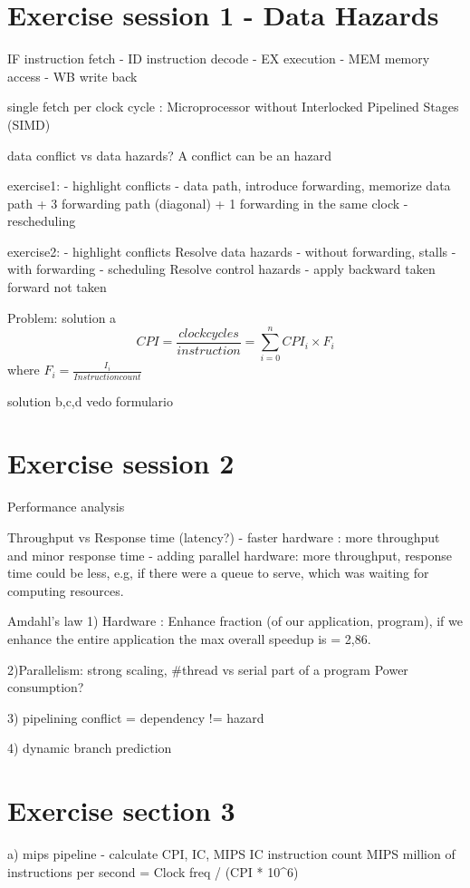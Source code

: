 
\section{Exercise session 1 - Data Hazards}\label{sec:exercise-session-1}
IF instruction fetch - ID instruction decode - EX execution - MEM memory access - WB write back

single fetch per clock cycle : Microprocessor without Interlocked Pipelined Stages (SIMD)

data conflict vs data hazards?
A conflict can be an hazard

exercise1:
- highlight conflicts
- data path, introduce forwarding, memorize data path + 3 forwarding path (diagonal) + 1 forwarding in the same clock
- rescheduling

exercise2:
- highlight conflicts
Resolve data hazards
- without forwarding, stalls
- with forwarding
- scheduling
Resolve control hazards
- apply backward taken forward not taken

Problem:
solution a
\[CPI = \frac{clock cycles}{instruction} = \sum_{i=0}^{n} CPI_i \times F_i\]
where \(F_i = \frac{I_i}{Instruction count}\)

solution b,c,d vedo formulario


\section{Exercise session 2}\label{sec:exercise-session-2}
Performance analysis

Throughput vs Response time (latency?)
- faster hardware : more throughput and minor response time
- adding parallel hardware: more throughput, response time could be less, e.g, if there were a queue to serve, which
was waiting for computing resources.

Amdahl's law
1) Hardware : Enhance fraction (of our application, program), if we enhance the entire application the max overall
speedup is = 2,86.

2)Parallelism: strong scaling, #thread vs serial part of a program
Power consumption?

3) pipelining
conflict = dependency != hazard

4) dynamic branch prediction



\section{Exercise section 3}\label{sec:exercise-section-3}
a) mips pipeline
- calculate CPI, IC, MIPS
IC instruction count
MIPS million of instructions per second = Clock freq / (CPI * 10^6)

